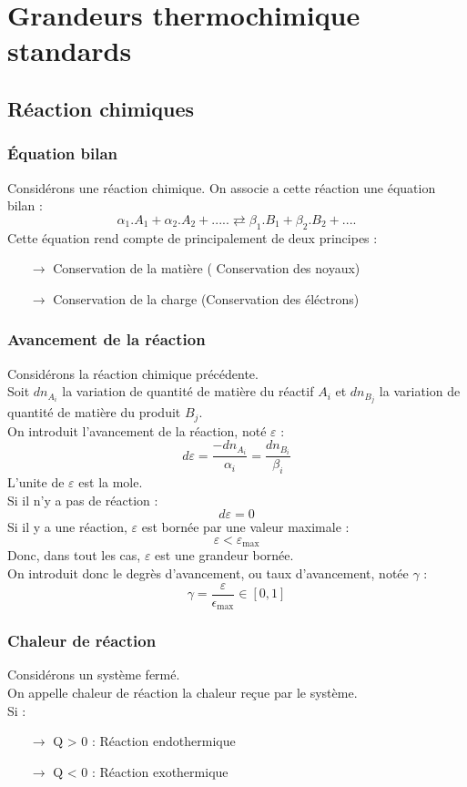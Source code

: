 \chapter{Grandeurs thermochimique standards}
\section{Réaction chimiques}
\subsection{Équation bilan}
\begin{de}
Considérons une réaction chimique. On associe a cette réaction une équation bilan : 
$$\alpha_1.A_1+\alpha_2.A_2+..... \rightleftarrows \beta_1.B_1+\beta_2.B_2+....$$
Cette équation rend compte de principalement de deux principes : 
\begin{itemize}
 \item[$\rightarrow$] Conservation de la matière ( Conservation des noyaux)
 \item[$\rightarrow$] Conservation de la charge (Conservation des éléctrons)
\end{itemize}
\end{de}
\subsection{Avancement de la réaction}
Considérons la réaction chimique précédente. \\
Soit $dn_{A_i}$ la variation de quantité de matière du réactif $A_i$ et $dn_{B_j}$ la variation de quantité de matière du produit $B_j$.\\
On introduit l'avancement de la réaction, noté $\varepsilon$ :
$$d\varepsilon = \dfrac{-dn_{A_i}}{\alpha_i} = \dfrac{dn_{B_i}}{\beta_i}$$
L'unite de $\varepsilon$ est la mole.\\
Si il n'y a pas de réaction : 
$$d\varepsilon = 0$$
Si il y a une réaction, $\varepsilon$ est bornée par une valeur maximale :
$$\varepsilon < \varepsilon_{\mbox{max}}$$
Donc, dans tout les cas, $\varepsilon$ est une grandeur bornée.\\
On introduit donc le degrès d'avancement, ou taux d'avancement, notée $\gamma$ : 
$$\gamma = \dfrac{\varepsilon}{\epsilon_{\mbox{max}}} \in \left[0,1\right]$$
\subsection{Chaleur de réaction}
\begin{de}
Considérons un système fermé.\\
On appelle chaleur de réaction la chaleur reçue par le système.\\
Si : 
\begin{itemize}
 \item[$\rightarrow$] Q > 0 : Réaction endothermique
 \item[$\rightarrow$] Q < 0 : Réaction exothermique
\end{itemize}
\end{de}
